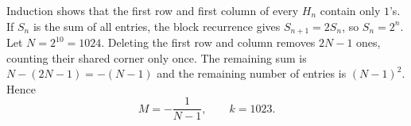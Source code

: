 Induction shows that the first row and first column of every $H_n$ contain only $1$'s. If $S_n$ is the sum of all entries, the block recurrence gives $S_{n+1}=2S_n$, so $S_n=2^n$. Let $N=2^{10}=1024$. Deleting the first row and column removes $2N-1$ ones, counting their shared corner only once. The remaining sum is $N-(2N-1)=-(N-1)$ and the remaining number of entries is $(N-1)^2$. Hence
\[
M=-\dfrac{1}{N-1},\qquad \boxed{k=1023}.
\]
